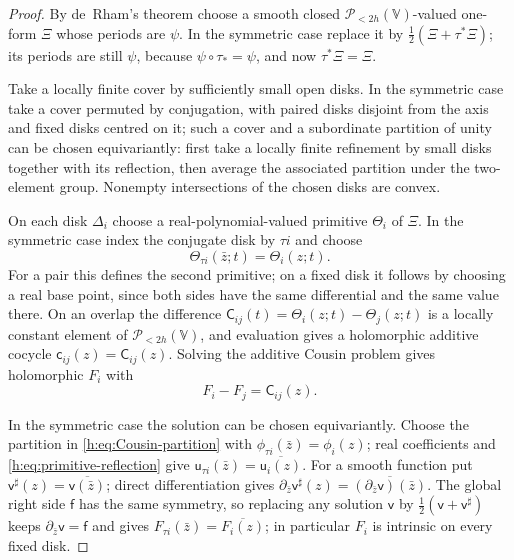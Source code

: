 \documentclass[11pt,a4paper]{article}
\numberwithin{equation}{section}
\theoremstyle{definition}
\theoremstyle{remark}
\theoremstyle{plain}
\newcommand{\VV}{\mathbb V}                       %
\newcommand{\PolH}{\mathscr P_{<2h}(\VV)}
\newcommand{\Herm}{\Theta}                        %
\begin{document}
\begin{proof}
By de~Rham's theorem choose a smooth closed $\PolH$-valued one-form $\Xi$ whose
periods are $\psi$. In the symmetric case replace it by
$\tfrac12(\Xi+\tau^*\Xi)$; its periods are still $\psi$, because
$\psi\circ\tau_*=\psi$, and now $\tau^*\Xi=\Xi$.

Take a locally finite cover by sufficiently small open disks. In the symmetric
case take a cover permuted by conjugation, with paired disks disjoint from the
axis and fixed disks centred on it; such a cover and a subordinate partition
of unity can be chosen equivariantly: first take a locally finite refinement by
small disks together with its reflection, then average the associated
partition under the two-element group. Nonempty intersections of the chosen
disks are convex.

On each disk $\Delta_i$ choose a real-polynomial-valued primitive $\Herm_i$ of
$\Xi$. In the symmetric case index the conjugate disk by $\tau i$ and choose
\begin{equation}\label{h:eq:primitive-reflection}
 \Herm_{\tau i}(\bar z;t)=\Herm_i(z;t).
\end{equation}
For a pair this defines the second primitive; on a fixed disk it follows by
choosing a real base point, since both sides have the same differential and the
same value there. On an overlap the difference
$\mathsf C_{ij}(t)=\Herm_i(z;t)-\Herm_j(z;t)$ is a locally constant element of
$\PolH$, and evaluation gives a holomorphic additive cocycle
$\mathsf c_{ij}(z)=\mathsf C_{ij}(z)$. Solving the additive Cousin problem gives
holomorphic $F_i$ with
\begin{equation}\label{h:eq:cocycle-F}
 F_i-F_j=\mathsf C_{ij}(z).
\end{equation}

In the symmetric case the solution can be chosen equivariantly. Choose the
partition in \eqref{h:eq:Cousin-partition} with $\phi_{\tau i}(\bar z)=\phi_i(z)$;
real coefficients and \eqref{h:eq:primitive-reflection} give
$\mathsf u_{\tau i}(\bar z)=\overline{\mathsf u_i(z)}$. For a smooth function
put $\mathsf v^\sharp(z)=\overline{\mathsf v(\bar z)}$; direct differentiation
gives $\partial_{\bar z}\mathsf v^\sharp(z)=\overline{(\partial_{\bar z}\mathsf
v)(\bar z)}$. The global right side $\mathsf f$ has the same symmetry, so
replacing any solution $\mathsf v$ by $\tfrac12(\mathsf v+\mathsf v^\sharp)$
keeps $\partial_{\bar z}\mathsf v=\mathsf f$ and gives
$F_{\tau i}(\bar z)=\overline{F_i(z)}$; in particular $F_i$ is intrinsic on
every fixed disk.


\end{proof}
\end{document}
